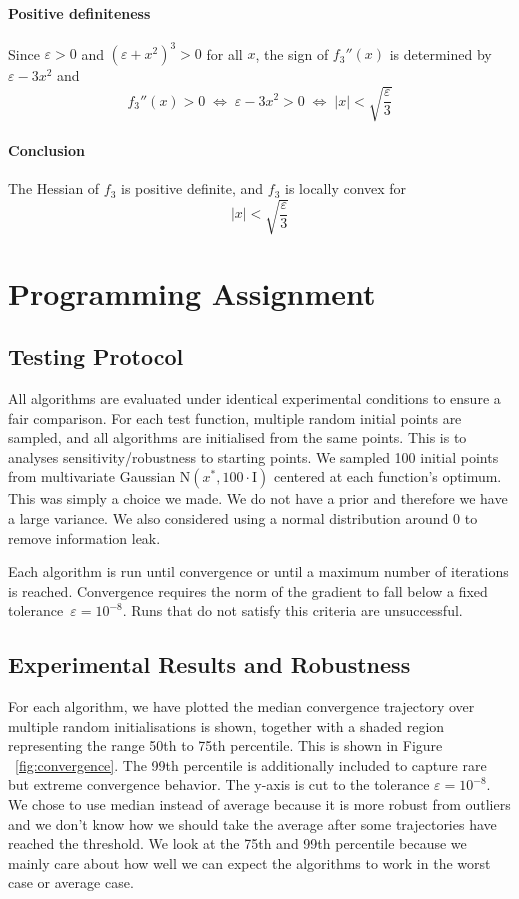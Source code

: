 \documentclass[12pt,a4paper]{article}
\begin{document}
\paragraph{Positive definiteness}
Since $\varepsilon>0$ and $(\varepsilon+x^2)^3>0$ for all $x$, the sign of $f_3''(x)$ is determined by $\varepsilon-3x^2$ and
\[
f_3''(x)>0
\;\Longleftrightarrow\;
\varepsilon-3x^2>0
\;\Longleftrightarrow\;
|x|<\sqrt{\frac{\varepsilon}{3}}
\]

\paragraph{Conclusion}
The Hessian of $f_3$ is positive definite, and $f_3$ is locally convex for
\[
|x|<\sqrt{\frac{\varepsilon}{3}}
\]

\section{Programming Assignment}

\subsection{Testing Protocol}
All algorithms are evaluated under identical experimental conditions to ensure a fair comparison. 
For each test function, multiple random initial points are sampled, and all algorithms are initialised from the same points. This is to analyses sensitivity/robustness to starting points. We sampled 100 initial points from multivariate Gaussian $\text{N}(x^*,100 \cdot \text{I})$ centered at each function's optimum. This was simply a choice we made. We do not have a prior and therefore we have a large variance. We also considered using a normal distribution around 0 to remove information leak.

Each algorithm is run until convergence or until a maximum number of iterations is reached. 
Convergence requires the norm of the gradient to fall below a fixed tolerance~$\varepsilon = 10^{-8}$.
Runs that do not satisfy this criteria are unsuccessful.

\subsection{Experimental Results and Robustness}

For each algorithm, we have plotted the median convergence trajectory over multiple random initialisations is shown, together with a shaded region representing the range 50th to 75th percentile. This is shown in Figure ~\ref{fig:convergence}.
The 99th percentile is additionally included to capture rare but extreme convergence behavior. The y-axis is cut to the tolerance $\varepsilon=10^{-8}$. We chose to use median instead of average because it is more robust from outliers and we don't know how we should take the average after some trajectories have reached the threshold.
We look at the 75th and 99th percentile because we mainly care about how well we can expect the algorithms to work in the worst case or average case.
\end{document}
